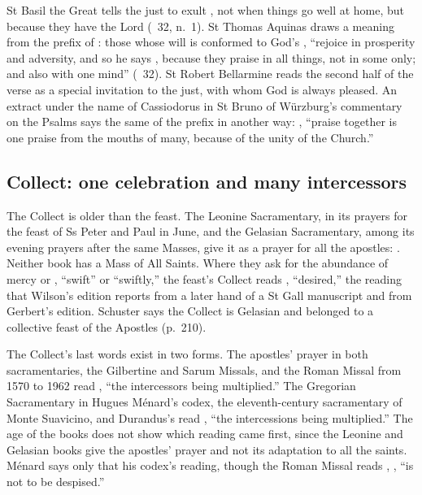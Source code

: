 St Basil the Great tells the just to exult , not when things go well
at home, but because they have the Lord (\ 32, n.~1). St
Thomas Aquinas draws a meaning from the prefix of : those
whose will is conformed to God's , ``rejoice in prosperity and adversity, and so he says
, because they praise in all things, not in some only;
and also with one mind'' (\ 32). St Robert Bellarmine reads the
second half of the verse as a special invitation to the just, with whom God is
always pleased. An extract under the name of Cassiodorus in St Bruno of
Würzburg's commentary on the Psalms says the same of the prefix in another
way: , ``praise together is one praise from the mouths of many, because of
the unity of the Church.''

\subsection{Collect: one celebration and many intercessors}
\label{sec:element-collect}

The Collect is older than the feast. The Leonine Sacramentary, in its prayers
for the feast of Ss Peter and Paul in June, and the Gelasian Sacramentary,
among its evening prayers after the same Masses, give it as a prayer for all
the apostles: . Neither book has a Mass of All Saints. Where they ask
for the abundance of mercy  or , ``swift'' or
``swiftly,'' the feast's Collect reads , ``desired,'' the
reading that Wilson's edition reports from a later hand of a St Gall
manuscript and from Gerbert's edition. Schuster says the Collect is Gelasian and belonged to a
collective feast of the Apostles (p.~210).

The Collect's last words exist in two forms. The apostles' prayer in both
sacramentaries, the Gilbertine and Sarum Missals, and the Roman Missal from
1570 to 1962 read , ``the intercessors
being multiplied.'' The Gregorian Sacramentary in Hugues Ménard's codex, the
eleventh-century sacramentary of Monte Suavicino, and Durandus's
 read , ``the
intercessions being multiplied.'' The age of the books does not show which
reading came first, since the Leonine and Gelasian books give the apostles'
prayer and not its adaptation to all the saints. Ménard says only that his
codex's reading, though the Roman Missal reads ,
, ``is not to be despised.''


